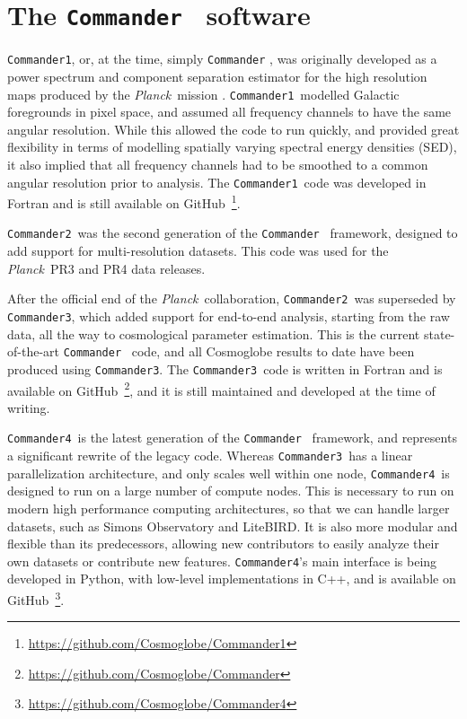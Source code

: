 \documentclass{moriond}
\def\commanderone{\texttt{Commander1}}
\def\commandertwo{\texttt{Commander2}}
\def\commanderthree{\texttt{Commander3}}
\def\commanderfour{\texttt{Commander4}}
\def\Planck{\textit{Planck}}
\DeclareRobustCommand{\Commander}{%
  \texorpdfstring{\texttt{Commander}}{Commander}%
}
\DeclareRobustCommand{\commanderone}{%
  \texorpdfstring{\texttt{Commander1}}{Commander1}%
}
\begin{document}
\section{The \Commander\ software}
\commanderone, or, at the time, simply \Commander, was originally developed as a power spectrum and component separation estimator for the high resolution maps produced by the \Planck\ mission \cite{planck2014-a12}. \commanderone\ modelled Galactic foregrounds in pixel space, and assumed all frequency channels to have the same angular resolution. While this allowed the code to run quickly, and provided great flexibility in terms of modelling spatially varying spectral energy densities (SED), it also implied that all frequency channels had to be smoothed to a common angular resolution prior to analysis. The \commanderone\ code was developed in Fortran and is still available on GitHub~\footnote{\url{https://github.com/Cosmoglobe/Commander1}}.

\commandertwo\ was the second generation of the \Commander\ framework, designed to add support for multi-resolution datasets. This code was used for the \Planck\ PR3 and PR4 data releases.

After the official end of the \Planck\ collaboration, \commandertwo\ was superseded by \commanderthree, which added support for end-to-end analysis, starting from the raw data, all the way to cosmological parameter estimation. This is the current state-of-the-art \Commander\ code, and all Cosmoglobe results to date have been produced using \commanderthree. The \commanderthree\ code is written in Fortran and is available on GitHub~\footnote{\url{https://github.com/Cosmoglobe/Commander}}, and it is still maintained and developed at the time of writing.

\commanderfour\ is the latest generation of the \Commander\ framework, and represents a significant rewrite of the legacy code. 
Whereas \commanderthree\ has a linear parallelization architecture, and only scales well within one node, \commanderfour\ is designed to run on a large number of compute nodes. This is necessary to run on modern high performance computing architectures, so that we can handle larger datasets, such as Simons Observatory and LiteBIRD. It is also more modular and flexible than its predecessors, allowing new contributors to easily analyze their own datasets or contribute new features. \commanderfour's main interface is being developed in Python, with low-level implementations in C++, and is available on GitHub~\footnote{\url{https://github.com/Cosmoglobe/Commander4}}.
\end{document}
